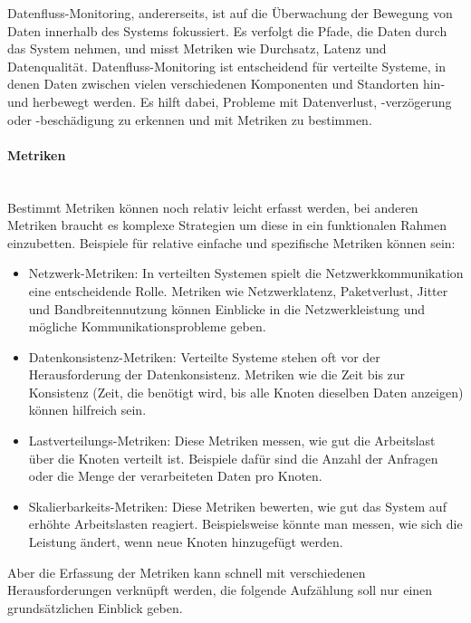 Datenfluss-Monitoring, andererseits, ist auf die Überwachung der Bewegung von Daten innerhalb des Systems fokussiert. Es verfolgt die Pfade, die Daten durch das System nehmen, und misst Metriken wie Durchsatz, Latenz und Datenqualität. Datenfluss-Monitoring ist entscheidend für verteilte Systeme, in denen Daten zwischen vielen verschiedenen Komponenten und Standorten hin- und herbewegt werden. Es hilft dabei, Probleme mit Datenverlust, -verzögerung oder -beschädigung zu erkennen und mit Metriken zu bestimmen.
\paragraph{Metriken\\\\}
Bestimmt Metriken können noch relativ leicht erfasst werden, bei anderen Metriken braucht es komplexe Strategien um diese in ein funktionalen Rahmen einzubetten. Beispiele für relative einfache und  spezifische Metriken können sein: 
\begin{itemize}
\item Netzwerk-Metriken: In verteilten Systemen spielt die Netzwerkkommunikation eine entscheidende Rolle. Metriken wie Netzwerklatenz, Paketverlust, Jitter und Bandbreitennutzung können Einblicke in die Netzwerkleistung und mögliche Kommunikationsprobleme geben.
\item Datenkonsistenz-Metriken: Verteilte Systeme stehen oft vor der Herausforderung der Datenkonsistenz. Metriken wie die Zeit bis zur Konsistenz (Zeit, die benötigt wird, bis alle Knoten dieselben Daten anzeigen) können hilfreich sein.
\item Lastverteilungs-Metriken: Diese Metriken messen, wie gut die Arbeitslast über die Knoten verteilt ist. Beispiele dafür sind die Anzahl der Anfragen oder die Menge der verarbeiteten Daten pro Knoten.
\item Skalierbarkeits-Metriken: Diese Metriken bewerten, wie gut das System auf erhöhte Arbeitslasten reagiert. Beispielsweise könnte man messen, wie sich die Leistung ändert, wenn neue Knoten hinzugefügt werden.
\end{itemize}
Aber die Erfassung der Metriken kann schnell mit verschiedenen Herausforderungen verknüpft werden, die folgende Aufzählung soll nur einen grundsätzlichen Einblick geben. 
